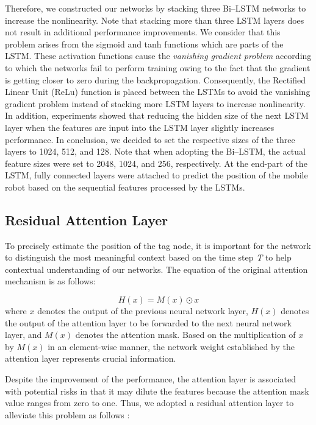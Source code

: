 \documentclass[letterpaper, 10 pt, conference]{ieeeconf}
\begin{document}
Therefore, we constructed our networks by stacking three Bi--LSTM networks to increase the nonlinearity. Note that stacking more than three LSTM layers does not result in additional performance improvements. We consider that this problem arises from the sigmoid and tanh functions which are parts of the LSTM. These activation functions cause the \textit{vanishing gradient problem} \cite{pascanu2013difficulty} according to which the networks fail to perform training owing to the fact that the gradient is getting closer to zero during the backpropagation. Consequently, the Rectified Linear Unit (ReLu) function is placed between the LSTMs to avoid the vanishing gradient problem \cite{nair2010rectified} instead of stacking more LSTM layers to increase nonlinearity. In addition, experiments showed that reducing the hidden size of the next LSTM layer when the features are input into the LSTM layer slightly increases performance. In conclusion, we decided to set the respective sizes of the three layers to 1024, 512, and 128. Note that when adopting the Bi--LSTM, the actual feature sizes were set to 2048, 1024, and 256, respectively. At the end-part of the LSTM, fully connected layers were attached to predict the position of the mobile robot based on the sequential features processed by the LSTMs.  

\subsection{Residual Attention Layer}

To precisely estimate the position of the tag node, it is important for the network to distinguish the most meaningful context based on the time step \textit{T} to help contextual understanding of our networks. The equation of the original attention mechanism is as follows:   

\begin{equation}
H(x)=M(x)\odot x
\end{equation} 
where $x$ denotes the output of the previous neural network layer, $H(x)$ denotes the output of the attention layer to be forwarded to the next neural network layer, and $M(x)$ denotes the attention mask. Based on the multiplication of $x$ by $M(x)$ in an element-wise manner, the network weight established by the attention layer represents crucial information. 

Despite the improvement of the performance, the attention layer is associated with potential risks in that it may dilute the features because the attention mask value ranges from zero to one. Thus, we adopted a residual attention layer to alleviate this problem as follows \cite{wang2017residual}:
\end{document}

